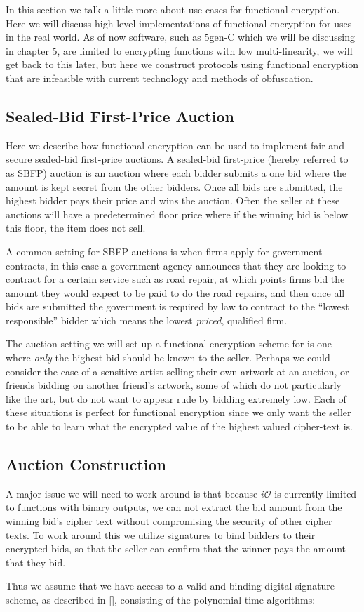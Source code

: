 \documentclass[12pt,twoside]{reedthesis}
\begin{document}
    
    In this section we talk a little more about use cases for functional encryption. Here we will discuss high level implementations of functional encryption for uses in the real world. As of now software, such as 5gen-C which we will be discussing in chapter 5, are limited to encrypting functions with low multi-linearity, we will get back to this later, but here we construct protocols using functional encryption that are infeasible with current technology and methods of obfuscation.
    \subsection{Sealed-Bid First-Price Auction}
    Here we describe how functional encryption can be used to implement fair and secure sealed-bid first-price auctions. A sealed-bid first-price (hereby referred to as SBFP) auction is an auction where each bidder submits a one bid where the amount is kept secret from the other bidders. Once all bids are submitted, the highest bidder pays their price and wins the auction. Often the seller at these auctions will have a predetermined floor price where if the winning bid is below this floor, the item does not sell. 
    \par A common setting for SBFP auctions is when firms apply for government contracts, in this case a government agency announces that they are looking to contract for a certain service such as road repair, at which points firms bid the amount they would expect to be paid to do the road repairs, and then once all bids are submitted the government is required by law to contract to the ``lowest responsible'' bidder which means the lowest \textit{priced}, qualified firm.
    \par The auction setting we will set up a functional encryption scheme for is one where \textit{only} the highest bid should be known to the seller. Perhaps we could consider the case of a sensitive artist selling their own artwork at an auction, or friends bidding on another friend's artwork, some of which do not particularly like the art, but do not want to appear rude by bidding extremely low. Each of these situations is perfect for functional encryption since we only want the seller to be able to learn what the encrypted value of the highest valued cipher-text is. 
    
    
    \subsection{Auction Construction}
    \newcommand{\sign}[0]{_\text{sign}}
    \par A major issue we will need to work around is that because $i\mathcal{O}$ is currently limited to functions with binary outputs, we can not extract the bid amount from the winning bid's cipher text without compromising the security of other cipher texts. To work around this we utilize signatures to bind bidders to their encrypted bids, so that the seller can confirm that the winner pays the amount that they bid.
    \par Thus we assume that we have access to a valid and binding digital signature scheme, as described in [\cite{Katz:2007:IMC:1206501}], consisting of the polynomial time algorithms: 
    
\end{document}
